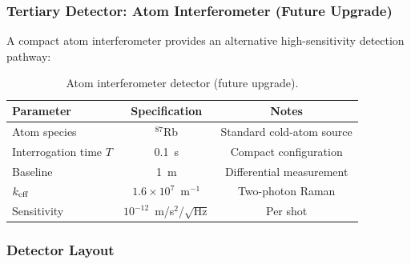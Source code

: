 \documentclass[11pt,onecolumn]{article}
\begin{document}
\subsubsection{Tertiary Detector: Atom Interferometer (Future Upgrade)}

A compact atom interferometer provides an alternative high-sensitivity
detection pathway:

\begin{table}[H]
\centering
\caption{Atom interferometer detector (future upgrade).}
\label{tab:ai-specs}
\begin{tabular}{lcc}
\toprule
Parameter & Specification & Notes \\
\midrule
Atom species & $^{87}$Rb & Standard cold-atom source \\
Interrogation time $T$ & 0.1~s & Compact configuration \\
Baseline & 1~m & Differential measurement \\
$k_{\rm eff}$ & $1.6 \times 10^7$~m$^{-1}$ & Two-photon Raman \\
Sensitivity & $10^{-12}$~m/s$^2$/$\sqrt{\text{Hz}}$ & Per shot \\
\bottomrule
\end{tabular}
\end{table}

\subsubsection{Detector Layout}
\end{document}

